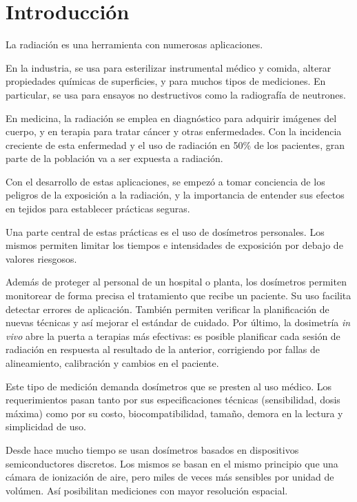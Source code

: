 \section{Introducción}
La radiación es una herramienta con numerosas aplicaciones.

En la industria, se usa para esterilizar instrumental médico y comida,
alterar propiedades químicas de superficies\cite{clough2001high},
y para muchos tipos de mediciones.
En particular, se usa para ensayos no destructivos
como la radiografía de neutrones\cite{berger_neutron_1960}.

En medicina, la radiación se emplea en diagnóstico para adquirir imágenes del cuerpo,
y en terapia para tratar cáncer y otras enfermedades.
Con la incidencia creciente de esta enfermedad 
y el uso de radiación en 50\% de los
pacientes\cite{symposium_assurance_dosimetry_1994},
gran parte de la población va a ser expuesta a radiación.

Con el desarrollo de estas aplicaciones,
se empezó a tomar conciencia de 
los peligros de la exposición a la radiación,
y la importancia de entender sus efectos en tejidos
para establecer prácticas seguras.

Una parte central de estas prácticas es el uso de dosímetros personales.
Los mismos permiten limitar los tiempos e intensidades de exposición
por debajo de valores riesgosos.

Además de proteger al personal de un hospital o planta,
los dosímetros permiten monitorear de forma precisa 
el tratamiento que recibe un paciente.
Su uso facilita detectar errores de aplicación\cite{noel_detection_1995}.
También permiten verificar la planificación de nuevas
técnicas y así mejorar el estándar de cuidado\cite{essers_vivo_1999}.
Por último, la dosimetría \emph{in vivo} 
abre la puerta a terapias más efectivas:
es posible planificar cada sesión de radiación
en respuesta al resultado de la anterior,
corrigiendo por fallas de alineamiento, calibración 
y cambios en el paciente\cite{wu_application_2006}.

Este tipo de medición demanda dosímetros 
que se presten al uso médico.
Los requerimientos pasan tanto por sus especificaciones técnicas
(sensibilidad, dosis máxima)
como por su costo,
biocompatibilidad, tamaño,
demora en la lectura y simplicidad de uso.

Desde hace mucho tiempo se usan dosímetros basados en 
dispositivos semiconductores discretos.
Los mismos se basan en el mismo principio que una cámara de ionización de aire,
pero miles de veces más sensibles por unidad de volúmen\cite{jones_application_1963}.
Así posibilitan mediciones con mayor resolución espacial.


